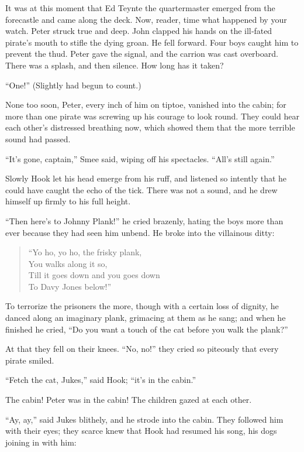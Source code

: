 It was at this moment that Ed Teynte the quartermaster emerged from the forecastle and came along the deck.
Now, reader, time what happened by your watch.
Peter struck true and deep.
John clapped his hands on the ill‐fated pirate’s mouth to stifle the dying groan.
He fell forward.
Four boys caught him to prevent the thud.
Peter gave the signal, and the carrion was cast overboard.
There was a splash, and then silence.
How long has it taken?

“One!”
(Slightly had begun to count.)

None too soon, Peter, every inch of him on tiptoe, vanished into the cabin;
for more than one pirate was screwing up his courage to look round.
They could hear each other’s distressed breathing now,
which showed them that the more terrible sound had passed.

“It’s gone, captain,” Smee said, wiping off his spectacles.
“All’s still again.”

Slowly Hook let his head emerge from his ruff,
and listened so intently that he could have caught the echo of the tick.
There was not a sound, and he drew himself up firmly to his full height.

“Then here’s to Johnny Plank!\@” he cried brazenly,
hating the boys more than ever because they had seen him unbend.
He broke into the villainous ditty:

\begin{verse}
	“Yo ho, yo ho, the frisky plank,\\
	You walks along it so,\\
	Till it goes down and you goes down\\
	To Davy Jones below!”
\end{verse}

To terrorize the prisoners the more, though with a certain loss of dignity,
he danced along an imaginary plank, grimacing at them as he sang;
and when he finished he cried, “Do you want a touch of the cat before you walk the plank?”

At that they fell on their knees.
“No, no!\@” they cried so piteously that every pirate smiled.

“Fetch the cat, Jukes,” said Hook;
“it’s in the cabin.”

The cabin!
Peter was in the cabin!
The children gazed at each other.

“Ay, ay,” said Jukes blithely, and he strode into the cabin.
They followed him with their eyes;
they scarce knew that Hook had resumed his song, his dogs joining in with him:

